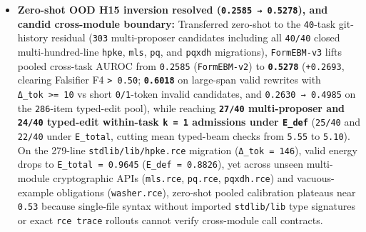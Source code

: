 \documentclass[10pt,letterpaper]{article}
\begin{document}
\begin{itemize}
{  accuracy} (both \texttt{\textgreater{}=\ 80.0\%}; \texttt{1.601} /
  \texttt{1.669} mean \texttt{rce\ check} calls vs \texttt{3.577}
  unreranked), and lifts \textbf{H11 strict 5-step monotonicity on
  \texttt{100} unseen corruption chains to \texttt{94.0\%} on
  \texttt{E\_depth} (Spearman \texttt{ρ\ =\ 0.\allowbreak{}9966}, median
  \texttt{1.0000}) and \texttt{92.0\%} on \texttt{E\_total}
  (\texttt{ρ\ =\ 0.\allowbreak{}9846}, median \texttt{1.0000})}. Ten-thread CPU
  scoring at \texttt{max\_\allowbreak{}seq\_\allowbreak{}len\ =\ 384} costs \texttt{232.\allowbreak{}45\ mJ}
  core RAPL per candidate (\texttt{32.55\ ms}, \texttt{362×} lower than
  local 35B generation;
  \texttt{derived\_\allowbreak{}marginal\_\allowbreak{}pkg\_\allowbreak{}reported\_\allowbreak{}j\ =\ None} at
  \texttt{37.7\%} co-tenant package drift).
\item
  \textbf{Zero-shot OOD H15 inversion resolved
  (\texttt{0.\allowbreak{}2585\ →\ 0.\allowbreak{}5278}), and candid cross-module boundary:}
  Transferred zero-shot to the \texttt{40}-task git-history residual
  (\texttt{303} multi-proposer candidates including all \texttt{40/40}
  closed multi-hundred-line \texttt{hpke}, \texttt{mls}, \texttt{pq},
  and \texttt{pqxdh} migrations), \texttt{FormEBM-\allowbreak{}v3} lifts pooled
  cross-task AUROC from \texttt{0.2585} (\texttt{FormEBM-\allowbreak{}v2}) to
  \textbf{\texttt{0.5278}} (\texttt{+0.2693}, clearing Falsifier F4
  \texttt{\textgreater{}\ 0.50}; \textbf{\texttt{0.6018}} on large-span
  valid rewrites with \texttt{Δ\_tok\ \textgreater{}=\ 10} vs short
  \texttt{0/1}-token invalid candidates, and \texttt{0.\allowbreak{}2630\ →\ 0.\allowbreak{}4985}
  on the \texttt{286}-item typed-edit pool), while reaching
  \textbf{\texttt{27/40} multi-proposer and \texttt{24/40} typed-edit
  within-task \texttt{k\ =\ 1} admissions under \texttt{E\_def}}
  (\texttt{25/40} and \texttt{22/40} under \texttt{E\_total}, cutting
  mean typed-beam checks from \texttt{5.55} to \texttt{5.10}). On the
  279-line \texttt{stdlib/\allowbreak{}lib/\allowbreak{}hpke.\allowbreak{}rce} migration
  (\texttt{Δ\_\allowbreak{}tok\ =\ 146}), valid energy drops to
  \texttt{E\_\allowbreak{}total\ =\ 0.\allowbreak{}9645} (\texttt{E\_\allowbreak{}def\ =\ 0.\allowbreak{}8826}), yet across
  unseen multi-module cryptographic APIs (\texttt{mls.rce},
  \texttt{pq.rce}, \texttt{pqxdh.rce}) and vacuous-example obligations
  (\texttt{washer.\allowbreak{}rce}), zero-shot pooled calibration plateaus near
  \texttt{0.53} because single-file syntax without imported
  \texttt{stdlib/\allowbreak{}lib} type signatures or exact \texttt{rce\ trace}
  rollouts cannot verify cross-module call contracts.
\end{itemize}
\end{document}
